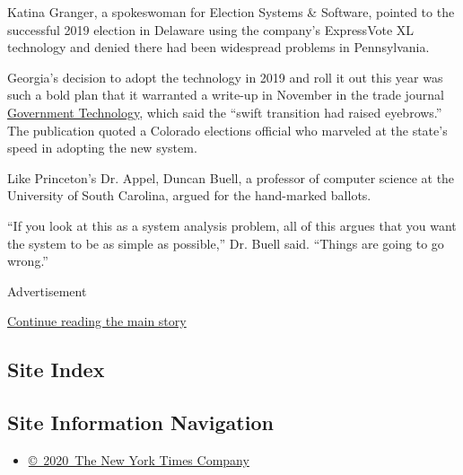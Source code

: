 Katina Granger, a spokeswoman for Election Systems \& Software, pointed
to the successful 2019 election in Delaware using the company's
ExpressVote XL technology and denied there had been widespread problems
in Pennsylvania.

Georgia's decision to adopt the technology in 2019 and roll it out this
year was such a bold plan that it warranted a write-up in November in
the trade journal
\href{https://www.govtech.com/security/Georgia-Hopes-New-Voting-System-Will-Protect-2020-Elections.html}{Government
Technology}, which said the ``swift transition had raised eyebrows.''
The publication quoted a Colorado elections official who marveled at the
state's speed in adopting the new system.

Like Princeton's Dr. Appel, Duncan Buell, a professor of computer
science at the University of South Carolina, argued for the hand-marked
ballots.

``If you look at this as a system analysis problem, all of this argues
that you want the system to be as simple as possible,'' Dr. Buell said.
``Things are going to go wrong.''

Advertisement

\protect\hyperlink{after-bottom}{Continue reading the main story}

\hypertarget{site-index}{%
\subsection{Site Index}\label{site-index}}

\hypertarget{site-information-navigation}{%
\subsection{Site Information
Navigation}\label{site-information-navigation}}

\begin{itemize}
\tightlist
\item
  \href{https://help.nytimes3xbfgragh.onion/hc/en-us/articles/115014792127-Copyright-notice}{©~2020~The
  New York Times Company}
\end{itemize}

